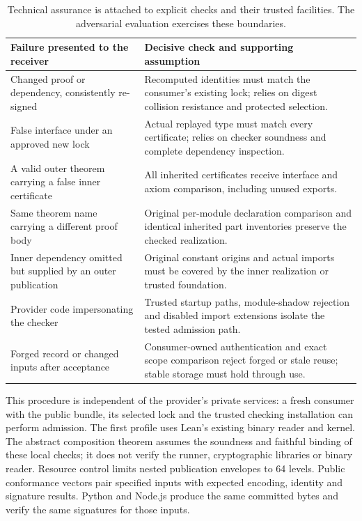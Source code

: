\documentclass[11pt]{article}
\begin{document}
\begin{table}[ht]
\centering\small
\renewcommand{\arraystretch}{1.12}
\begin{tabularx}{\linewidth}{@{}>{\raggedright\arraybackslash}X>{\raggedright\arraybackslash}X@{}}
\toprule
Failure presented to the receiver & Decisive check and supporting assumption\\
\midrule
Changed proof or dependency, consistently re-signed & Recomputed identities must match the consumer's existing lock; relies on digest collision resistance and protected selection.\\[3pt]
False interface under an approved new lock & Actual replayed type must match every certificate; relies on checker soundness and complete dependency inspection.\\[3pt]
A valid outer theorem carrying a false inner certificate & All inherited certificates receive interface and axiom comparison, including unused exports.\\[3pt]
Same theorem name carrying a different proof body & Original per-module declaration comparison and identical inherited part inventories preserve the checked realization.\\[3pt]
Inner dependency omitted but supplied by an outer publication & Original constant origins and actual imports must be covered by the inner realization or trusted foundation.\\[3pt]
Provider code impersonating the checker & Trusted startup paths, module-shadow rejection and disabled import extensions isolate the tested admission path.\\[3pt]
Forged record or changed inputs after acceptance & Consumer-owned authentication and exact scope comparison reject forged or stale reuse; stable storage must hold through use.\\
\bottomrule
\end{tabularx}
\caption{Technical assurance is attached to explicit checks and their trusted
facilities. The adversarial evaluation exercises these boundaries.}
\label{tab:assurance}
\end{table}

This procedure is independent of the provider's private services: a fresh
consumer with the public bundle, its selected lock and the trusted checking
installation can perform admission. The first profile uses Lean's existing
binary reader and kernel. The abstract composition theorem assumes the
soundness and faithful binding of these local checks; it does not verify the
runner, cryptographic libraries or binary reader. Resource control limits
nested publication envelopes to 64 levels. Public conformance vectors pair specified inputs with expected encoding,
identity and signature results. Python and Node.js produce the same committed
bytes and verify the same signatures for those inputs.
\end{document}
